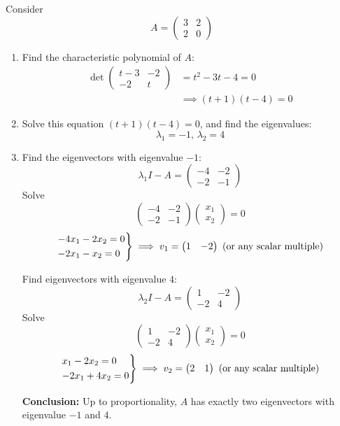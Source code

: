 \documentclass[10pt]{scrartcl}
\begin{document}
\begin{example}
Consider 
\[
  A = \begin{pmatrix}
 3 & 2\\ 2 & 0	
 \end{pmatrix}
\]
\begin{enumerate}
\item Find the characteristic polynomial of $A$: 
\begin{align*}
\det\begin{pmatrix}
t-3 & -2\\ -2 & t	
\end{pmatrix} &= t^2 - 3t- 4 = 0 \\
&\implies (t+1)(t-4) = 0
\end{align*}
\item Solve this equation $(t+1)(t-4) = 0$, and find the eigenvalues: \[\lambda_1 = -1,\,\lambda_2 = 4\] 
\item Find the eigenvectors with eigenvalue $-1$: 
\[
  \lambda_1I-A = \begin{pmatrix}
 -4 & -2\\ -2 & -1	
 \end{pmatrix}
\]
Solve
\[
  \begin{pmatrix}
  -4 & -2\\ -2 &-1	
  \end{pmatrix}\begin{pmatrix}
x_1 \\ x_2	
\end{pmatrix}= 0
\]
\[
  \begin{rcases*}
  -4x_1 -2x_2 = 0\\
  -2x_1 - x_2 = 0	
  \end{rcases*}\implies v_1 = \begin{pmatrix}
 1 & -2	
 \end{pmatrix}\text{ (or any scalar multiple)}
\]

Find eigenvectors with eigenvalue $4$:
\[
  \lambda_2I-A = \begin{pmatrix}
 1 & -2\\ -2 & 4
 \end{pmatrix}
\]
Solve
\[
  \begin{pmatrix}
  1 & -2\\ -2 &4	
  \end{pmatrix}\begin{pmatrix}
x_1 \\ x_2	
\end{pmatrix}= 0
\]
\[
  \begin{rcases*}
  x_1 -2x_2 = 0\\
  -2x_1 + 4x_2 = 0	
  \end{rcases*}\implies v_2 = \begin{pmatrix}
 2 & 1
 \end{pmatrix}\text{ (or any scalar multiple)}
\]

\textbf{Conclusion:} Up to proportionality, $A$ has exactly two eigenvectors with eigenvalue $-1$ and $4$. 
\end{enumerate}
\end{example}
\end{document}
